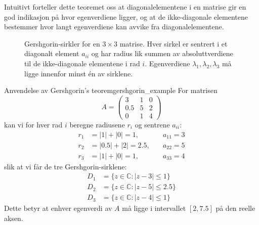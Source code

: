 \documentclass[../../main.tex]{subfiles}
\begin{document}
Intuitivt forteller dette teoremet oss at diagonalelementene i en matrise gir en god indikasjon på hvor egenverdiene ligger, og at de ikke-diagonale elementene bestemmer hvor langt egenverdiene kan avvike fra diagonalelementene.

\begin{figure}
    \centering
    \caption{Gershgorin-sirkler for en $3 \times 3$ matrise. Hver sirkel er sentrert i et diagonalt element $a_{ii}$ og har radius lik summen av absoluttverdiene til de ikke-diagonale elementene i rad $i$. Egenverdiene $\lambda_1, \lambda_2, \lambda_3$ må ligge innenfor minst én av sirklene.}
    \label{fig:gershgorin}
\end{figure}

\begin{example}{Anvendelse av Gershgorin's teorem}{gershgorin_example}
    For matrisen
    \[
        A = \begin{pmatrix} 3 & 1 & 0 \\ 0.5 & 5 & 2 \\ 0 & 1 & 4 \end{pmatrix}
    \]
    kan vi for hver rad $i$ beregne radiusene $r_i$ og sentrene $a_{ii}$:
    \begin{align*}
        r_1 & = |1| + |0| = 1,     & \quad a_{11} = 3 \\
        r_2 & = |0.5| + |2| = 2.5, & \quad a_{22} = 5 \\
        r_3 & = |1| + |0| = 1,     & \quad a_{33} = 4
    \end{align*}
    slik at vi får de tre Gershgorin-sirklene:
    \begin{align*}
        D_1 & = \{z \in \mathbb{C} : |z - 3| \leq 1\}   \\
        D_2 & = \{z \in \mathbb{C} : |z - 5| \leq 2.5\} \\
        D_3 & = \{z \in \mathbb{C} : |z - 4| \leq 1\}
    \end{align*}
    Dette betyr at enhver egenverdi av $A$ må ligge i intervallet $[2,7.5]$ på den reelle aksen.
\end{example}
\end{document}
